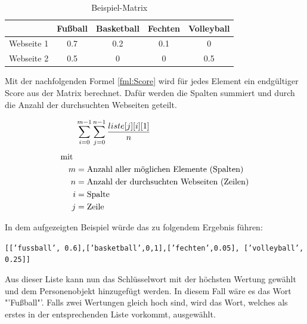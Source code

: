	\begin{table}[h!]
		\centering
		\begin{tabular}{ | c | c | c |c |c|}
			\hline
			& Fußball & Basketball & Fechten& Volleyball\\ \hline
			Webseite 1& 0.7 & 0.2 & 0.1 & 0\\ \hline
			Webseite 2& 0.5 & 0 & 0 & 0.5\\ \hline
		\end{tabular}
		\label{img:beispielMatrix}
		\caption{Beispiel-Matrix}
	\end{table}
	
	Mit der nachfolgenden Formel \ref{fml:Score} wird für jedes Element ein endgültiger Score aus der Matrix berechnet. Dafür werden die Spalten summiert und durch die Anzahl der durchsuchten Webseiten geteilt.
	
	\begin{align}%
	\label{fml:Score}
	\begin{split}%
	&\sum\limits_{i=0}^{m-1}\sum\limits_{j=0}^{n-1} \frac{liste[j][i][1]}{n}\\[0.25\baselineskip]%
	\text{mit } \\
	m &= \text{Anzahl aller möglichen Elemente (Spalten)}\\
	n &= \text{Anzahl der durchsuchten Webseiten (Zeilen)}\\
	i &= \text{Spalte}\\             %
	j &= \text{Zeile}
	\end{split}
	\end{align}
	
	
	In dem aufgezeigten Beispiel würde das zu folgendem Ergebnis führen:
	
	\texttt{[['fussball', 0.6],['basketball',0,1],['fechten',0.05],
		['volleyball', 0.25]]}		
	
	Aus dieser Liste kann nun das Schlüsselwort mit der höchsten Wertung gewählt und dem Personenobjekt hinzugefügt werden. In diesem Fall wäre es das Wort "'Fußball"'. Falls zwei Wertungen gleich hoch sind, wird das  Wort, welches als erstes in der entsprechenden Liste vorkommt, ausgewählt.
	
